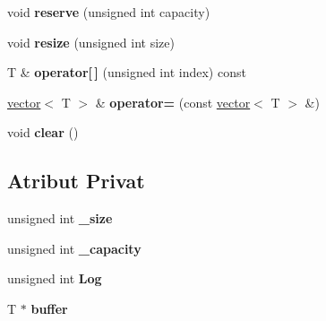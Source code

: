 \begin{DoxyCompactItemize}
\item 
\hypertarget{classvector_ae37ac6075980a3113fc442ce4411204c}{}void {\bfseries reserve} (unsigned int capacity)\label{classvector_ae37ac6075980a3113fc442ce4411204c}

\item 
\hypertarget{classvector_a313d7dd651ab48eeddf7845cbd5bc5af}{}void {\bfseries resize} (unsigned int size)\label{classvector_a313d7dd651ab48eeddf7845cbd5bc5af}

\item 
\hypertarget{classvector_ab6ebd10d627f8eb33e15c27cf7aaf36a}{}T \& {\bfseries operator\mbox{[}$\,$\mbox{]}} (unsigned int index) const \label{classvector_ab6ebd10d627f8eb33e15c27cf7aaf36a}

\item 
\hypertarget{classvector_ad88d3a7709894cdb0b471db0a7a8eb6f}{}\hyperlink{classvector}{vector}$<$ T $>$ \& {\bfseries operator=} (const \hyperlink{classvector}{vector}$<$ T $>$ \&)\label{classvector_ad88d3a7709894cdb0b471db0a7a8eb6f}

\item 
\hypertarget{classvector_a1a91cd18e54c382af1097d630405398f}{}void {\bfseries clear} ()\label{classvector_a1a91cd18e54c382af1097d630405398f}

\end{DoxyCompactItemize}
\subsection*{Atribut Privat}
\begin{DoxyCompactItemize}
\item 
\hypertarget{classvector_adc0382744358059c7ed8c9315ea691aa}{}unsigned int {\bfseries \+\_\+size}\label{classvector_adc0382744358059c7ed8c9315ea691aa}

\item 
\hypertarget{classvector_a1c2a061959c956eb85805934b00ad75d}{}unsigned int {\bfseries \+\_\+capacity}\label{classvector_a1c2a061959c956eb85805934b00ad75d}

\item 
\hypertarget{classvector_a71e90789f12e267399ac7387521cc548}{}unsigned int {\bfseries Log}\label{classvector_a71e90789f12e267399ac7387521cc548}

\item 
\hypertarget{classvector_adb51efa5b9d82cddfa401836401bb8f1}{}T $\ast$ {\bfseries buffer}\label{classvector_adb51efa5b9d82cddfa401836401bb8f1}

\end{DoxyCompactItemize}


